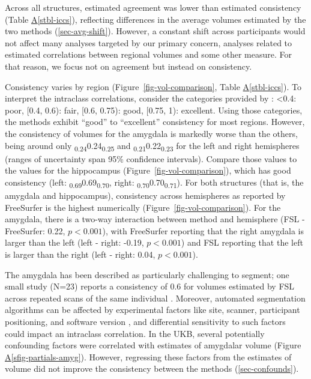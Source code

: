\documentclass[
  authoryear,
  preprint,
  1p]{elsarticle}
\newcommand*\quartosfigref[1]{Figure \hyperref[#1]{A\ref{#1}}}
\newcommand*\quartostblref[1]{Table \hyperref[#1]{A\ref{#1}}}
\begin{document}
Across all structures, estimated agreement was lower than estimated
consistency (\quartostblref{stbl-iccs}), reflecting differences in the
average volumes estimated by the two methods (\ref{sec-avg-shift}).
However, a constant shift across participants would not affect many
analyses targeted by our primary concern, analyses related to estimated
correlations between regional volumes and some other measure. For that
reason, we focus not on agreement but instead on consistency.

Consistency varies by region (Figure~\ref{fig-vol-comparison},
\quartostblref{stbl-iccs}). To interpret the intraclass correlations,
consider the categories provided by \citet{cicchetti1981}: \textless0.4:
poor, {[}0.4, 0.6): fair, {[}0.6, 0.75): good, {[}0.75, 1): excellent.
Using those categories, the methods exhibit ``good'' to ``excellent''
consistency for most regions. However, the consistency of volumes for
the amygdala is markedly worse than the others, being around only
\textsubscript{0.24}0.24\textsubscript{0.25} and
\textsubscript{0.21}0.22\textsubscript{0.23} for the left and right
hemispheres (ranges of uncertainty span 95\% confidence intervals).
Compare those values to the values for the hippocampus
(Figure~\ref{fig-vol-comparison}), which has good consistency (left:
\textsubscript{0.69}0.69\textsubscript{0.70}, right:
\textsubscript{0.70}0.70\textsubscript{0.71}). For both structures (that
is, the amygdala and hippocampus), consistency across hemispheres as
reported by FreeSurfer is the highest numerically
(Figure~\ref{fig-vol-comparison}). For the amygdala, there is a two-way
interaction between method and hemisphere (FSL - FreeSurfer: 0.22,
\(p<0.001\)), with FreeSurfer reporting that the right amygdala is
larger than the left (left - right: -0.19, \(p<0.001\)) and FSL
reporting that the left is larger than the right (left - right: 0.04,
\(p<0.001\)).

The amygdala has been described as particularly challenging to segment;
one small study (N=23) reports a consistency of 0.6 for volumes
estimated by FSL across repeated scans of the same individual
\citep{morey2010}. Moreover, automated segmentation algorithms can be
affected by experimental factors like site, scanner, participant
positioning, and software version
\citep{hedges2022, du2021, mcguire2017, yang2016, liu2020, mulder_hippocampal_2014, morey2010, perlaki2017},
and differential sensitivity to such factors could impact an intraclass
correlation. In the UKB, several potentially confounding factors were
correlated with estimates of amygdalar volume
(\quartosfigref{sfig-partials-amyg}). However, regressing these factors
from the estimates of volume did not improve the consistency between the
methods (\ref{sec-confounds}).
\end{document}
